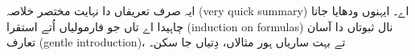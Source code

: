 \documentclass[../../../include/open-logic-chapter]{subfiles}
\begin{document}

\begin{editorial}
  ایہ صرف تعریفاں دا نہایت مختصر خلاصہ (very quick summary) اے۔ ایہنوں
  ودھایا جانا چاہیدا اے تاں جو فارمولیاں اُتے استقرا (induction on
  formulas) نال ثبوتاں دا آسان تعارف (gentle introduction)، تے بہت
  ساریاں ہور مثالاں، دِتیاں جا سکن۔
\end{editorial}







\OLEndChapterHook
\end{document}
